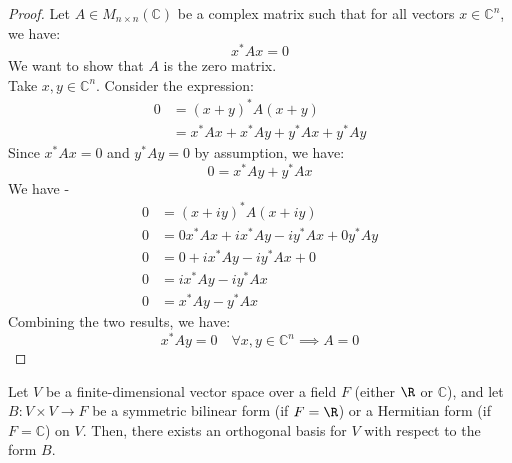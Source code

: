 \documentclass[openany]{book}
\renewcommand{\C}{\mathbb{C}}
\begin{document}
\begin{proof}
Let $A \in M_{n\times n}(\C)$ be a complex matrix such that for all vectors $x \in \C^n$, we have:
$$x^* A x = 0$$
We want to show that $A$ is the zero matrix. \\
Take $x, y \in \C^n$. Consider the expression:
\[\begin{aligned}
0 &= (x + y)^* A (x + y) \\
&= x^* A x + x^* A y + y^* A x + y^* A y
\end{aligned}\]
Since $x^* A x = 0$ and $y^* A y = 0$ by assumption, we have:
$$0 = x^* A y + y^* A x$$
We have - 
\[\begin{aligned}
    0 &= (x + iy)^* A (x + iy) \\
    0 &= 0 x^* A x + i x^* A y - i y^* A x + 0 y^* A y \\
    0 &= 0 + i x^* A y - i y^* A x + 0 \\
    0 &= i x^* A y - i y^* A x \\
    0 &= x^* A y - y^* A x
\end{aligned}\]
Combining the two results, we have:
$$x^* A y = 0 \quad \forall x, y \in \C^n \implies A = 0$$
\end{proof}
\begin{mytheorem}
Let $V$ be a finite-dimensional vector space over a field $F$ (either $\R$ or $\C$), and let $B: V \times V \to F$ be a symmetric bilinear form (if $F = \R$) or a Hermitian form (if $F = \C$) on $V$. Then, there exists an orthogonal basis for $V$ with respect to the form $B$.
\end{mytheorem}
\end{document}
